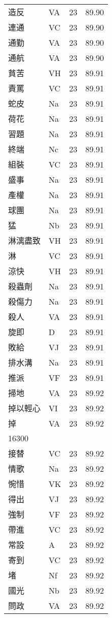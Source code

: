\documentclass[twocolumn]{book}
\begin{document}
\begin{supertabular}{llrr}
造反 & VA & 23 &  89.90\\
連通 & VC & 23 &  89.90\\
通勤 & VA & 23 &  89.90\\
通航 & VA & 23 &  89.90\\
貧苦 & VH & 23 &  89.91\\
責罵 & VC & 23 &  89.91\\
蛇皮 & Na & 23 &  89.91\\
荷花 & Na & 23 &  89.91\\
習題 & Na & 23 &  89.91\\
終端 & Nc & 23 &  89.91\\
組裝 & VC & 23 &  89.91\\
盛事 & Na & 23 &  89.91\\
產權 & Na & 23 &  89.91\\
球團 & Na & 23 &  89.91\\
猛 & Nb & 23 &  89.91\\
淋漓盡致 & VH & 23 &  89.91\\
淋 & VC & 23 &  89.91\\
涼快 & VH & 23 &  89.91\\
殺蟲劑 & Na & 23 &  89.91\\
殺傷力 & Na & 23 &  89.91\\
殺人 & VA & 23 &  89.91\\
旋即 & D & 23 &  89.91\\
敗給 & VJ & 23 &  89.91\\
排水溝 & Na & 23 &  89.91\\
推派 & VF & 23 &  89.91\\
掃地 & VA & 23 &  89.92\\
掉以輕心 & VI & 23 &  89.92\\
掉 & VA & 23 &  89.92\\
16300\\
接替 & VC & 23 &  89.92\\
情歌 & Na & 23 &  89.92\\
惋惜 & VK & 23 &  89.92\\
得出 & VJ & 23 &  89.92\\
強制 & VF & 23 &  89.92\\
帶進 & VC & 23 &  89.92\\
常設 & A & 23 &  89.92\\
寄到 & VC & 23 &  89.92\\
堵 & Nf & 23 &  89.92\\
國光 & Nb & 23 &  89.92\\
問政 & VA & 23 &  89.92\\

\end{supertabular}
\end{document}
